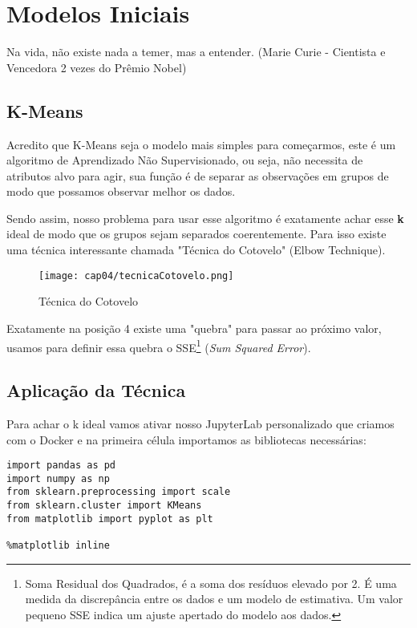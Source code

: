 \chapter{Modelos Iniciais}

\begin{remark}
Na vida, não existe nada a temer, mas a entender. (Marie Curie - Cientista e Vencedora 2 vezes do Prêmio Nobel) 
\end{remark}

\section{K-Means}
Acredito que K-Means seja o modelo mais simples para começarmos, este é um algoritmo de Aprendizado Não Supervisionado, ou seja, não necessita de atributos alvo para agir, sua função é de separar as observações em grupos de modo que possamos observar melhor os dados.

Sendo assim, nosso problema para usar esse algoritmo é exatamente achar esse \textbf{k} ideal de modo que os grupos sejam separados coerentemente. Para isso existe uma técnica interessante chamada "Técnica do Cotovelo" (Elbow Technique).
\begin{figure}[H]
	\centering
	\texttt{[image: cap04/tecnicaCotovelo.png]}
	\caption{Técnica do Cotovelo}
\end{figure}

Exatamente na posição 4 existe uma "quebra" para passar ao próximo valor, usamos para definir essa quebra o SSE\footnote{Soma Residual dos Quadrados, é a soma dos resíduos elevado por 2. É uma medida da discrepância entre os dados e um modelo de estimativa. Um valor pequeno SSE indica um ajuste apertado do modelo aos dados.} (\textit{Sum Squared Error}).

\section{Aplicação da Técnica}

Para achar o k ideal vamos ativar nosso JupyterLab personalizado que criamos com o Docker e na primeira célula importamos as bibliotecas necessárias:
\begin{lstlisting}[]
import pandas as pd
import numpy as np
from sklearn.preprocessing import scale
from sklearn.cluster import KMeans
from matplotlib import pyplot as plt

%matplotlib inline
\end{lstlisting}

